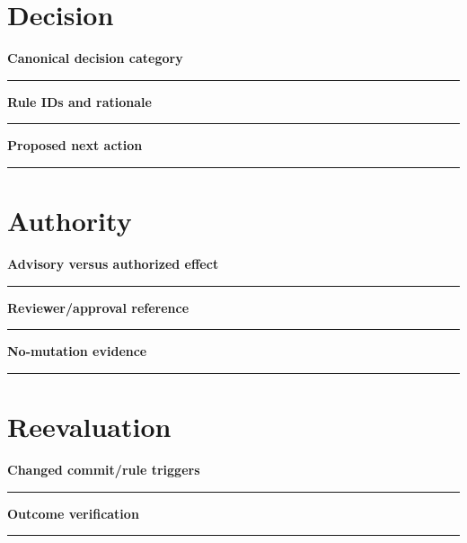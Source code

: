 \documentclass[11pt,letterpaper]{article}
\begin{document}
\section{Decision}
\noindent\textbf{Canonical decision category}\par
\vspace{1.1em}\noindent\rule{0.96\linewidth}{0.4pt}\par\vspace{0.65em}
\noindent\textbf{Rule IDs and rationale}\par
\vspace{1.1em}\noindent\rule{0.96\linewidth}{0.4pt}\par\vspace{0.65em}
\noindent\textbf{Proposed next action}\par
\vspace{1.1em}\noindent\rule{0.96\linewidth}{0.4pt}\par\vspace{0.65em}
\section{Authority}
\noindent\textbf{Advisory versus authorized effect}\par
\vspace{1.1em}\noindent\rule{0.96\linewidth}{0.4pt}\par\vspace{0.65em}
\noindent\textbf{Reviewer/approval reference}\par
\vspace{1.1em}\noindent\rule{0.96\linewidth}{0.4pt}\par\vspace{0.65em}
\noindent\textbf{No-mutation evidence}\par
\vspace{1.1em}\noindent\rule{0.96\linewidth}{0.4pt}\par\vspace{0.65em}
\section{Reevaluation}
\noindent\textbf{Changed commit/rule triggers}\par
\vspace{1.1em}\noindent\rule{0.96\linewidth}{0.4pt}\par\vspace{0.65em}
\noindent\textbf{Outcome verification}\par
\vspace{1.1em}\noindent\rule{0.96\linewidth}{0.4pt}\par\vspace{0.65em}
\end{document}
